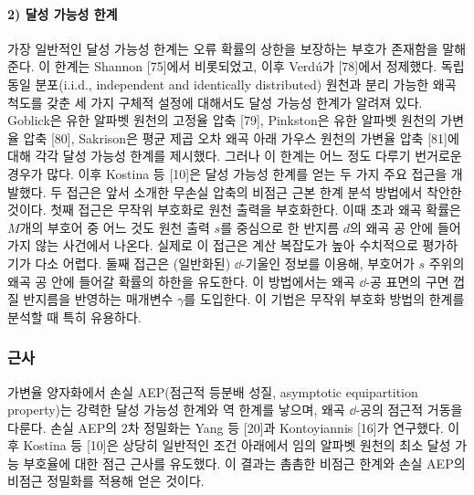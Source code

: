 \paragraph{2) 달성 가능성 한계}
가장 일반적인 달성 가능성 한계는 오류 확률의 상한을 보장하는 부호가 존재함을 말해 준다.
이 한계는 Shannon [75]에서 비롯되었고, 이후 Verdú가 [78]에서 정제했다.
독립 동일 분포(i.i.d., independent and identically distributed) 원천과 분리 가능한 왜곡 척도를 갖춘 세 가지 구체적 설정에 대해서도 달성 가능성 한계가 알려져 있다.
Goblick은 유한 알파벳 원천의 고정율 압축 [79], Pinkston은 유한 알파벳 원천의 가변율 압축 [80], Sakrison은 평균 제곱 오차 왜곡 아래 가우스 원천의 가변율 압축 [81]에 대해 각각 달성 가능성 한계를 제시했다.
그러나 이 한계는 어느 정도 다루기 번거로운 경우가 많다.
이후 Kostina 등 [10]은 달성 가능성 한계를 얻는 두 가지 주요 접근을 개발했다.
두 접근은 앞서 소개한 무손실 압축의 비점근 근본 한계 분석 방법에서 착안한 것이다.
첫째 접근은 무작위 부호화로 원천 출력을 부호화한다.
이때 초과 왜곡 확률은 $M$개의 부호어 중 어느 것도 원천 출력 $s$를 중심으로 한 반지름 $d$의 왜곡 공 안에 들어가지 않는 사건에서 나온다.
실제로 이 접근은 계산 복잡도가 높아 수치적으로 평가하기가 다소 어렵다.
둘째 접근은 (일반화된) $\dd$-기울인 정보를 이용해, 부호어가 $s$ 주위의 왜곡 공 안에 들어갈 확률의 하한을 유도한다.
이 방법에서는 왜곡 $\dd$-공 표면의 구면 껍질 반지름을 반영하는 매개변수 $\gamma$를 도입한다.
이 기법은 무작위 부호화 방법의 한계를 분석할 때 특히 유용하다.

\subsubsection{근사}

가변율 양자화에서 손실 AEP(점근적 등분배 성질, asymptotic equipartition property)는 강력한 달성 가능성 한계와 역 한계를 낳으며, 왜곡 $\dd$-공의 점근적 거동을 다룬다.
손실 AEP의 2차 정밀화는 Yang 등 [20]과 Kontoyiannis [16]가 연구했다.
이후 Kostina 등 [10]은 상당히 일반적인 조건 아래에서 임의 알파벳 원천의 최소 달성 가능 부호율에 대한 점근 근사를 유도했다.
이 결과는 촘촘한 비점근 한계와 손실 AEP의 비점근 정밀화를 적용해 얻은 것이다.

